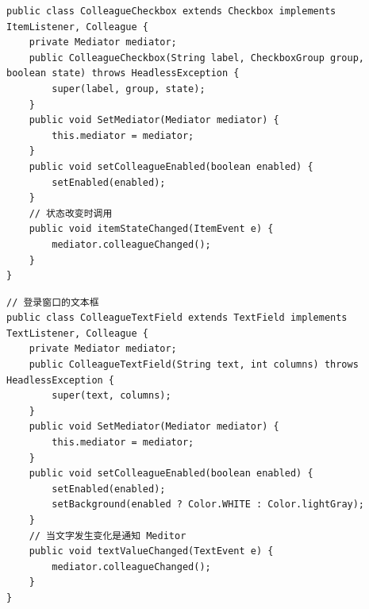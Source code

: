 \begin{lstlisting}
public class ColleagueCheckbox extends Checkbox implements ItemListener, Colleague {
	private Mediator mediator;
	public ColleagueCheckbox(String label, CheckboxGroup group, boolean state) throws HeadlessException {
		super(label, group, state);
	}
	public void SetMediator(Mediator mediator) {
		this.mediator = mediator;
	}
	public void setColleagueEnabled(boolean enabled) {
		setEnabled(enabled);
	}
	// 状态改变时调用
	public void itemStateChanged(ItemEvent e) {
		mediator.colleagueChanged();
	}
}
\end{lstlisting}
\begin{lstlisting}
// 登录窗口的文本框
public class ColleagueTextField extends TextField implements TextListener, Colleague {
	private Mediator mediator;
	public ColleagueTextField(String text, int columns) throws HeadlessException {
		super(text, columns);
	}
	public void SetMediator(Mediator mediator) {
		this.mediator = mediator;
	}
	public void setColleagueEnabled(boolean enabled) {
		setEnabled(enabled);
		setBackground(enabled ? Color.WHITE : Color.lightGray);
	}
	// 当文字发生变化是通知 Meditor
	public void textValueChanged(TextEvent e) {
		mediator.colleagueChanged();
	}
}
\end{lstlisting}
